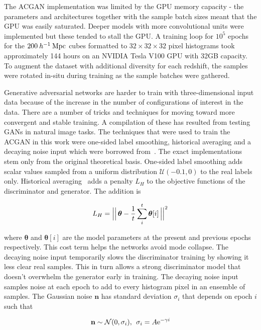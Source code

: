 \documentclass[twocolumn]{article}
\numberwithin{equation}{section}
\begin{document}
The ACGAN implementation was limited by the GPU memory capacity - the parameters and architectures together with the 
sample batch sizes meant that the GPU was easily saturated. Deeper models with more convolutional units were implemented 
but these tended to stall the GPU. A training loop for $10^5$ epochs for the $200 \: h^{-1} \: \textup{Mpc}$ cubes 
formatted to $32 \times 32 \times 32$ pixel histograms took approximately 144 hours on an NVIDIA Tesla V100 GPU with 
32GB capacity. To augment the dataset with additional diversity for each redshift, the samples were rotated in-situ during 
training as the sample batches were gathered. 

Generative adversarial networks are harder to train with three-dimensional input data because of the increase in the 
number of configurations of interest in the data. There are a number of tricks and techniques for moving toward more 
convergent and stable training. A compilation of these has resulted from testing GANs in natural image tasks. The techniques
that were used to train the ACGAN in this work were one-sided label smoothing, historical averaging and a decaying noise 
input which were borrowed from~\cite{gantricks_sali, gan_noise_decay}. The exact implementations stem only from the 
original theoretical basis. One-sided label smoothing adds scalar values sampled from a uniform distribution $\mathcal{U}
(-0.1,0)$ to the real labels only. Historical averaging~\cite{gantricks_sali} adds a penalty $L_H$ to the objective functions 
of the discriminator and generator. The addition is

\begin{equation}
    L_H = \Bigl\lvert\Bigl\lvert \, \bm{\theta} - \frac{1}{t} \sum_i^t\bm{\theta}[i] \,  \Bigr\rvert\Bigr\rvert^2
\end{equation}

where $\bm{\theta}$ and $\bm{\theta}[i]$ are the model parameters at the present and previous epochs respectively. This
cost term helps the networks avoid mode collapse. The decaying noise input temporarily slows the discriminator training
by showing it less clear real samples. This in turn allows a strong discriminator model that doesn't overwhelm the generator
early in training. The decaying noise input samples noise at each epoch to add to every histogram pixel in an ensemble of
samples. The Gaussian noise $\mathbf{n}$ has standard deviation $\sigma_i$ that depends on epoch $i$ such that 

\begin{equation}
    \mathbf{n} \sim \mathcal{N}(0,\sigma_i), \: \: \sigma_i = A \textup{e}^{-\gamma i}
\end{equation}
\end{document}
